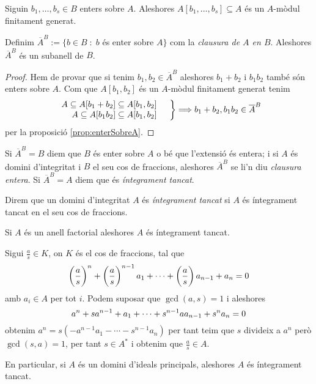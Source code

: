 \documentclass[../../../main.tex]{subfiles}
\begin{document}
\begin{coro}
\label{coro:entersSobreA} Siguin $b_1,\ldots,b_s\in B$ enters sobre $A$. Aleshores $A[b_1,\ldots,b_s]\subseteq A$ és un $A$-mòdul finitament generat.
\end{coro}


\begin{coro}
\label{coro:clausuraAEnB} Definim $\overline{A}^B:=\{b\in B\;:\;b$ és enter sobre $A\}$ com la \textit{clausura de $A$ en $B$}. Aleshores $\overline{A}^B$ és un subanell de $B$.
\end{coro}
\begin{proof}
Hem de provar que si tenim $b_1,b_2\in \overline{A}^B$ aleshores $b_1+b_2$ i $b_1b_2$ també són enters sobre $A$. Com que $A[b_1,b_2]$ és un $A$-mòdul finitament generat tenim
\begin{equation}
    \notag
    \left.
    \begin{array}{rl}
        A\subseteq A[b_1+b_2]\subseteq A[b_1,b_2] &  \\
        A\subseteq A[b_1b_2]\subseteq A[b_1,b_2] & 
    \end{array}
    \right\} \Longrightarrow b_1+b_2,b_1b_2\in \overline{A}^B
\end{equation}
per la proposició \ref{prop:enterSobreA}. 
\end{proof}

\begin{nota}
Si $\overline{A}^B = B$ diem que $B$ és  enter sobre $A$ o bé que l'extensió és entera;\label{def:integramentTancat} i si $A$ és domini d'integritat i $B$ el seu cos de fraccions, aleshores $\overline{A}^B$ se li'n diu \textit{clausura entera}. Si $\overline{A}^B = A$ diem que és \textit{íntegrament tancat}.
\end{nota}


\begin{defi}
\label{def:integramentTancat2} Direm que un domini d'integritat $A$ és \textit{íntegrament tancat} si $A$ és íntegrament tancat en el seu cos de fraccions.
\end{defi}

\begin{ej}
Si $A$ és un anell factorial aleshores $A$ és íntegrament tancat. 

Sigui $\frac{a}{s}\in K$, on $K$ és el cos de fraccions, tal que
\begin{equation}
    \notag
    \left(\frac{a}{s}\right)^n+\left(\frac{a}{s}\right)^{n-1}a_1+\cdots+\left(\frac{a}{s}\right)a_{n-1}+a_n = 0
\end{equation}
amb $a_i\in A$ per tot $i$. Podem suposar que $\gcd(a,s) = 1$ i aleshores
\begin{equation}
    \notag
    a^n+sa^{n-1}+a_1+\cdots+s^{n-1}aa_{n-1}+s^na_n=0
\end{equation}
obtenim $a^n = s(-a^{n-1}a_1-\cdots-s^{n-1}a_n)$ per tant teim que $s$ divideix a $a^n$ però $\gcd(s,a) = 1$, per tant $s\in A^*$ i obtenim que $\frac{a}{s}\in A$.

En particular, si $A$ és un domini d'ideals principals, aleshores $A$ és íntegrament tancat.
\end{ej}
\end{document}
